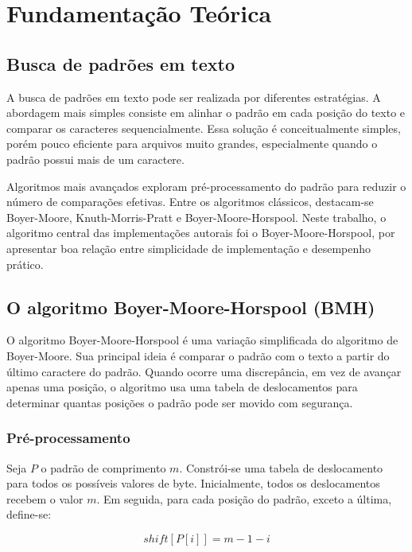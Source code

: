 \documentclass[10pt,twocolumn,a4paper]{article}
\begin{document}

\section{Fundamentação Teórica}

\subsection{Busca de padrões em texto}

A busca de padrões em texto pode ser realizada por diferentes estratégias. A abordagem mais simples consiste em alinhar o padrão em cada posição do texto e comparar os caracteres sequencialmente. Essa solução é conceitualmente simples, porém pouco eficiente para arquivos muito grandes, especialmente quando o padrão possui mais de um caractere.

Algoritmos mais avançados exploram pré-processamento do padrão para reduzir o número de comparações efetivas. Entre os algoritmos clássicos, destacam-se Boyer-Moore, Knuth-Morris-Pratt e Boyer-Moore-Horspool. Neste trabalho, o algoritmo central das implementações autorais foi o Boyer-Moore-Horspool, por apresentar boa relação entre simplicidade de implementação e desempenho prático.

\subsection{O algoritmo Boyer-Moore-Horspool (BMH)}

O algoritmo Boyer-Moore-Horspool é uma variação simplificada do algoritmo de Boyer-Moore. Sua principal ideia é comparar o padrão com o texto a partir do último caractere do padrão. Quando ocorre uma discrepância, em vez de avançar apenas uma posição, o algoritmo usa uma tabela de deslocamentos para determinar quantas posições o padrão pode ser movido com segurança.

\subsubsection{Pré-processamento}

Seja $P$ o padrão de comprimento $m$. Constrói-se uma tabela de deslocamento para todos os possíveis valores de byte. Inicialmente, todos os deslocamentos recebem o valor $m$. Em seguida, para cada posição do padrão, exceto a última, define-se:

\[
shift[P[i]] = m - 1 - i
\]
\end{document}
